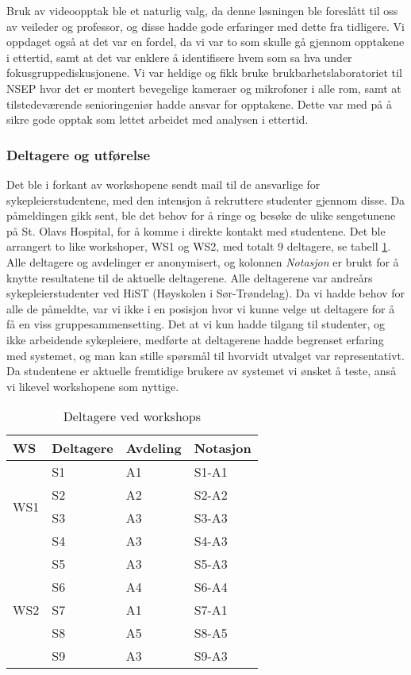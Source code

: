 \noindent
Bruk av videoopptak ble et naturlig valg, da denne løsningen ble foreslått til oss av veileder og professor, og disse hadde gode erfaringer med dette fra tidligere. Vi oppdaget også at det var en fordel, da vi var to som skulle gå gjennom opptakene i ettertid, samt at det var enklere å identifisere hvem som sa hva under fokusgruppediskusjonene. 
Vi var heldige og fikk bruke brukbarhetslaboratoriet til NSEP hvor det er montert bevegelige kameraer og mikrofoner i alle rom, samt at tilstedeværende senioringeniør hadde ansvar for opptakene. Dette var med på å sikre gode opptak som lettet arbeidet med analysen i ettertid.

\subsubsection{Deltagere og utførelse}
\label{deltagere}
Det ble i forkant av workshopene sendt mail til de ansvarlige for sykepleierstudentene, med den intensjon å rekruttere studenter gjennom disse. Da påmeldingen gikk sent, ble det behov for å ringe og besøke de ulike sengetunene på St. Olavs Hospital, for å komme i direkte kontakt med studentene. 
Det ble arrangert to like workshoper, WS1 og WS2, med totalt 9 deltagere, se tabell \ref{Deltagere_WS}. Alle deltagere og avdelinger er anonymisert, og kolonnen \emph{Notasjon} er brukt for å knytte resultatene til de aktuelle deltagerene. Alle deltagerene var andreårs sykepleierstudenter ved HiST (Høyskolen i Sør-Trøndelag). Da vi hadde behov for alle de påmeldte, var vi ikke i en posisjon hvor vi kunne velge ut deltagere for å få en viss gruppesammensetting. Det at vi kun hadde tilgang til studenter, og ikke arbeidende sykepleiere, medførte at deltagerene hadde begrenset erfaring med systemet, og man kan stille spørsmål til hvorvidt utvalget var representativt. Da studentene er aktuelle fremtidige brukere av systemet vi ønsket å teste, anså vi likevel workshopene som nyttige.

\begin{table}[H]
\centering
\begin{tabular}{ |l|l|l|l| }
\hline
WS & Deltagere & Avdeling & Notasjon \\ \hline
\multirow{4}{*}{WS1} & S1 & A1 & S1-A1 \\
 & S2 & A2 & S2-A2 \\
 & S3 & A3 & S3-A3 \\
 & S4 & A3 & S4-A3 \\ \hline
\multirow{5}{*}{WS2} & S5 & A3 & S5-A3 \\
 & S6 & A4 & S6-A4 \\
 & S7 & A1 & S7-A1 \\
 & S8 & A5 & S8-A5 \\
 & S9 & A3 & S9-A3 \\ 
\hline
\end{tabular}
\label{Deltagere_WS}
\caption{Deltagere ved workshops}
\end{table}

